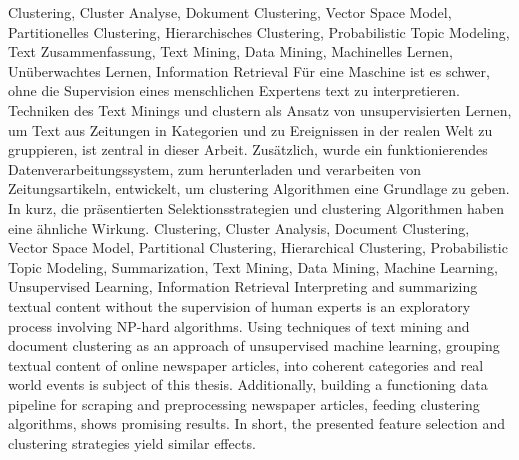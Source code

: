 \HAWAbstractPage
  {
    Clustering, Cluster Analyse, 
    Dokument Clustering, Vector Space Model,
    Partitionelles Clustering,
    Hierarchisches Clustering,
    Probabilistic Topic Modeling, 
    Text Zusammenfassung,
    Text Mining, Data Mining,
    Machinelles Lernen, Unüberwachtes Lernen, 
    Information Retrieval
  }
  { 
    Für eine Maschine ist es schwer, ohne die Supervision eines menschlichen Expertens text zu interpretieren. Techniken des Text Minings und clustern als Ansatz von unsupervisierten Lernen, um Text aus Zeitungen in Kategorien und zu Ereignissen in der realen Welt zu gruppieren, ist zentral in dieser Arbeit. Zusätzlich, wurde ein funktionierendes Datenverarbeitungssystem, zum herunterladen und verarbeiten von Zeitungsartikeln, entwickelt, um clustering Algorithmen eine Grundlage zu geben. In kurz, die präsentierten Selektionsstrategien und clustering Algorithmen haben eine ähnliche Wirkung.
  }
  { 
    Clustering, Cluster Analysis, 
    Document Clustering, Vector Space Model,
    Partitional Clustering,
    Hierarchical Clustering,
    Probabilistic Topic Modeling,
    Summarization,
    Text Mining, Data Mining,
    Machine Learning, Unsupervised Learning, 
    Information Retrieval
  }
  {
    Interpreting and summarizing textual content without the supervision of human experts is an exploratory process involving NP-hard algorithms. Using techniques of text mining and document clustering as an approach of unsupervised machine learning, grouping textual content of online newspaper articles, into coherent categories and real world events is subject of this thesis. Additionally, building a functioning data pipeline for scraping and preprocessing newspaper articles, feeding clustering algorithms, shows promising results. In short, the presented feature selection and clustering strategies yield similar effects.
  }



